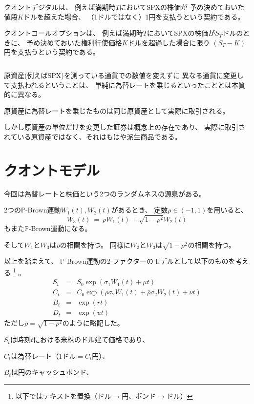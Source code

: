\documentclass[uplatex,a4j,12pt,dvipdfmx]{jsarticle}
\begin{document}
クオントデジタルは、
例えば満期時$T$においてSPXの株価が
予め決めておいた値段$K$ドルを超えた場合、
（1ドルではなく）1円を支払うという契約である。

クオントコールオプションは、
例えば満期時$T$においてSPXの株価が$S_{T}$ドルのときに、
予め決めておいた権利行使価格$K$ドルを超過した場合に限り
$(S_{T}-K)$円を支払うという契約である。

${}$

原資産(例えばSPX)を測っている通貨での数値を変えずに
異なる通貨に変更して支払われるということは、
単純に為替レートを乗じるといったこととは本質的に異なる。

原資産に為替レートを乗じたものは同じ原資産として実際に取引される。

しかし原資産の単位だけを変更した証券は概念上の存在であり、
実際に取引されている原資産ではなく、それはもはや派生商品である。

\section{クオントモデル}

今回は為替レートと株価という2つのランダムネスの源泉がある。

2つの$\mathbb{P}$-Brown運動$W_{1}(t),W_{2}(t)$があるとき、
定数$\rho \in (-1,1)$を用いると、
$$
	W_{3}(t)
	\ = \
	\rho W_{1}(t) +
	\sqrt{1 - \rho^{2} } W_{2}(t)
$$
もまた$\mathbb{P}$-Brown運動になる。

そして$W_{1}$と$W_{3}$は$\rho$の相関を持つ。
同様に$W_{2}$と$W_{3}$は$\sqrt{1 - \rho^{2}}$の相関を持つ。

以上を踏まえて、
$\mathbb{P}$-Brown運動の2-ファクターのモデルとして以下のものを考える
%
\footnote{以下ではテキストを置換（ドル$\to$円、ポンド$\to$ドル）}
%
。
%
%
\begin{eqnarray*}
	S_{t}
	&=&
	S_{0}
	\exp \left( \sigma_{1} W_{1}(t) + \mu t \right)
	\\
	C_{t}
	&=&
	C_{0}
	\exp \left(
	\rho \sigma_{2} W_{1}(t) +
	\bar{\rho} \sigma_{2} W_{2}(t) + \nu t \right)
	\\
	B_{t}
	&=&
	\exp (rt)
	\\
	D_{t}
	&=&
	\exp (ut)
\end{eqnarray*}
%
%
ただし$\bar{\rho} = \sqrt{1 - \rho^{2}}$のように略記した。

$S_{t}$は時刻$t$における米株のドル建て価格であり、

$C_{t}$は為替レート（1ドル$=C_{t}$円）、

$B_{t}$は円のキャッシュボンド、
\end{document}

